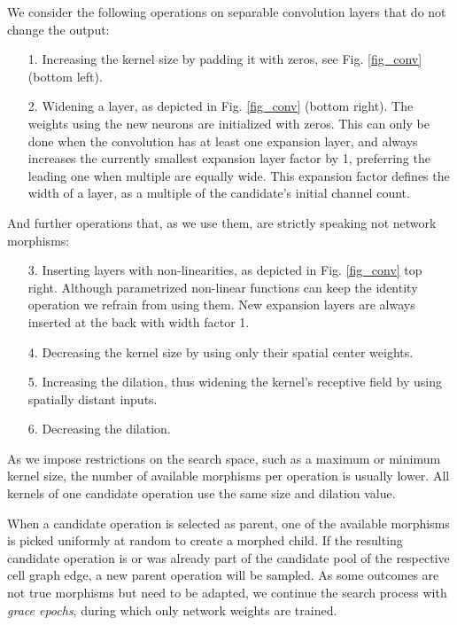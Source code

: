 \documentclass[conference]{IEEEtran}
\begin{document}
We consider the following operations on separable convolution layers that do not change the output:
\begin{enumerate}
	\item[1.] {
		Increasing the kernel size by padding it with zeros, see Fig. \ref{fig_conv} (bottom left).
	}
	\item[2.] {
		Widening a layer, as depicted in Fig. \ref{fig_conv} (bottom right). The weights using the new neurons are initialized with zeros. This can only be done when the convolution has at least one expansion layer, and always increases the currently smallest expansion layer factor by 1, preferring the leading one when multiple are equally wide. This expansion factor defines the width of a layer, as a multiple of the candidate's initial channel count. 
	}
\end{enumerate}
And further operations that, as we use them, are strictly speaking not network morphisms:
\begin{enumerate}
	\item[3.] {
		Inserting layers with non-linearities, as depicted in Fig. \ref{fig_conv} top right. Although parametrized non-linear functions can keep the identity operation \cite{morph} we refrain from using them. New expansion layers are always inserted at the back with width factor 1.
	}
	\item[4.] {
		Decreasing the kernel size by using only their spatial center weights.
	}
	\item[5.] {
		Increasing the dilation, thus widening the kernel's receptive field by using spatially distant inputs.
	}
	\item[6.] {
		Decreasing the dilation.
	}
\end{enumerate}
As we impose restrictions on the search space, such as a maximum or minimum kernel size, the number of available morphisms per operation is usually lower. All kernels of one candidate operation use the same size and dilation value.

When a candidate operation is selected as parent, one of the available morphisms is picked uniformly at random to create a morphed child.
If the resulting candidate operation is or was already part of the candidate pool of the respective cell graph edge, a new parent operation will be sampled.
As some outcomes are not true morphisms but need to be adapted, we continue the search process with \textit{grace epochs}, during which only network weights are trained.
\end{document}
